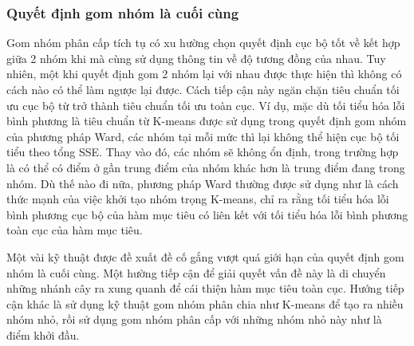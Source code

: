\subsubsection{Quyết định gom nhóm là cuối cùng}
Gom nhóm phân cấp tích tụ có xu hường chọn quyết định cục bộ tốt về kết hợp giữa 2 nhóm khi mà cùng sử dụng thông tin về độ tương đồng của nhau.
Tuy nhiên, một khi quyết định gom 2 nhóm lại với nhau được thực hiện thì không có cách nào có thể làm ngược lại được.
Cách tiếp cận này ngăn chặn tiêu chuẩn tối ưu cục bộ từ trở thành tiêu chuẩn tối ưu toàn cục.
Ví dụ, mặc dù tối tiểu hóa lỗi bình phương là tiêu chuẩn từ K-means được sử dụng trong quyết định gom nhóm của phương pháp Ward, các nhóm tại mỗi mức thì lại không thể hiện cục bộ tối tiểu theo tổng SSE.
Thay vào đó, các nhóm sẽ không ổn định, trong trường hợp là có thể có điểm ở gần trung điểm của nhóm khác hơn là trung điểm đang trong nhóm.
Dù thế nào đi nữa, phương pháp Ward thường được sử dụng như là cách thức mạnh của việc khởi tạo nhóm trọng K-means, chỉ ra rằng tối tiểu hóa lỗi bình phương cục bộ của hàm mục tiêu có liên kết với tối tiểu hóa lỗi bình phương toàn cục của hàm mục tiêu.

Một vài kỹ thuật được đề xuất đề cố gắng vượt quá giới hạn của quyết định gom nhóm là cuối cùng.
Một hường tiếp cận để giải quyết vấn đề này là di chuyển những nhánh cây ra xung quanh để cái thiện hàm mục tiêu toàn cục.
Hướng tiếp cận khác là sử dụng kỹ thuật gom nhóm phân chia như K-means để tạo ra nhiều nhóm nhỏ, rồi sử dụng gom nhóm phân cấp với những nhóm nhỏ này như là điểm khởi đầu.






